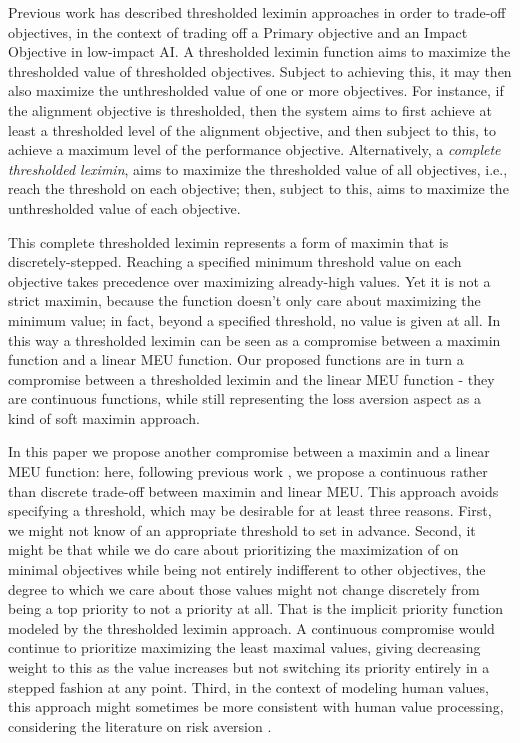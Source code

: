 Previous work \cite{vamplew_potential-based_2021} has described thresholded leximin approaches in order to trade-off objectives, in the context of trading off a Primary objective and an Impact Objective in low-impact AI. A thresholded leximin function aims to maximize the thresholded value of thresholded objectives. Subject to achieving this, it may then also maximize the unthresholded value of one or more objectives. For instance, if the alignment objective is thresholded, then the system aims to first achieve at least a thresholded level of the alignment objective, and then subject to this, to achieve a maximum level of the performance objective. Alternatively, a \textit{complete thresholded leximin}, aims to maximize the thresholded value of all objectives, i.e., reach the threshold on each objective; then, subject to this, aims to maximize the unthresholded value of each objective.

This complete thresholded leximin represents a form of maximin that is discretely-stepped. Reaching a specified minimum threshold value on each objective takes precedence over maximizing already-high values. Yet it is not a strict maximin, because the function doesn't only care about maximizing the minimum value; in fact, beyond a specified threshold, no value is given at all. In this way a thresholded leximin can be seen as a compromise between a maximin function and a linear MEU function. Our proposed functions are in turn a compromise between a thresholded leximin and the linear MEU function - they are continuous functions, while still representing the loss aversion aspect as a kind of soft maximin approach.

In this paper we propose another compromise between a maximin and a linear MEU function: here, following previous work \cite{rolf_need_2020}, we propose a continuous rather than discrete trade-off between maximin and linear MEU. This approach avoids specifying a threshold, which may be desirable for at least three reasons. First, we might not know of an appropriate threshold to set in advance. Second, it might be that while we do care about prioritizing the maximization of on minimal objectives while being not entirely indifferent to other objectives, the degree to which we care about those values might not change discretely from being a top priority to not a priority at all. That is the implicit priority function modeled by the thresholded leximin approach. A continuous compromise would continue to prioritize maximizing the least maximal values, giving decreasing weight to this as the value increases but not switching its priority entirely in a stepped fashion at any point. Third, in the context of modeling human values, this approach might sometimes be more consistent with human value processing\cite{Tom515}, considering the literature on risk aversion \cite{pratt1978risk}.


